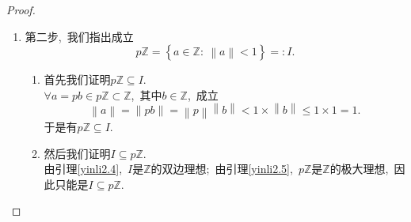 \documentclass[UTF8, twoside]{ctexart}
\makeatletter
\newcommand*\bigcdot{\mathpalette\bigcdot@{.5}}
\newcommand*\bigcdot@[2]{\mathbin{\vcenter{\hbox{\scalebox{#2}{$\m@th#1\bullet$}}}}}
\theoremstyle{nonumberplain}
\newtheorem{proof}{\heiti 证明}  %
\theoremstyle{nonumberplain}
\theoremstyle{plain}
\makeatother
\begin{document}
\begin{proof}
\begin{enumerate}
\begin{enumerate}
\begin{align}
					& =1. 
				\end{align}
				另一方面,\ 由定义\ref{赋值定义}的第(1)条,\ 有
				\begin{equation} \label{Os:1.1.4}
					\left\| 0 \right\|=0.
				\end{equation}
				由命题\ref{赋值性质}的性质(1),\ 有
				\begin{equation} \label{Os:1.1.5}
					\left\| 1 \right\|=1.
				\end{equation}
				由式(\ref{Os:1.1.3}),\ 式(\ref{Os:1.1.4}),\ 式(\ref{Os:1.1.5})和命题\ref{赋值性质}的性质(4),\ 
				$\forall a=b/c\in \mathbb{Q}$,\ 其中$b\in \mathbb{Z}$,\ $c\in {{\mathbb{Z}}_{\ne 0}}$,\ 有
				\begin{equation} \label{Os:1.1.6}
					\left\| a \right\|=\left\| \frac{b}{c} \right\|=\frac{\left\| b \right\|}{\left\| c \right\|}=\left\{ \begin{aligned}
						& 1,\ b\ne 0, \\ 
						& 0,\ b=0. \\ 
					\end{aligned} \right.
				\end{equation}
				式(\ref{Os:1.1.6})意味着$\left\| \bigcdot  \right\|$是平凡赋值,\ 矛盾.\ 
				由反证法,\ 至少存在一个素数$p$满足$\left\| p \right\|\ne 1$. 由式(\ref{Os:1.1.1}),\ 
				成立$\left\| p \right\|<1$.
				\vskip 0.3cm
			
				\item 第二步,\ 我们指出成立
				\begin{equation} \label{Os:1.2.1}
					p\mathbb{Z}=\left\{ a\in \mathbb{Z}:\ \left\| a \right\|<1 \right\}=:I.
				\end{equation}
				\vskip 0.3cm
				\begin{enumerate}
					\item 首先我们证明$p\mathbb{Z}\subseteq I$.\\
					$\forall a=pb\in p\mathbb{Z}\subset \mathbb{Z}$,\ 其中$b\in \mathbb{Z}$,\ 成立
					\[
					\left\| a \right\|=\left\| pb \right\|=\left\| p \right\|\left\| b \right\|<1\times \left\| b \right\|\le 1\times 1=1.
					\]
					于是有$p\mathbb{Z}\subseteq I$.\ 
					\vskip 0.3cm
					
					\item 然后我们证明$I\subseteq p\mathbb{Z}$.\\
					由引理\ref{yinli2.4},\ $I$是$\mathbb{Z}$的双边理想;\ 
					由引理\ref{yinli2.5},\ $p\mathbb{Z}$是$\mathbb{Z}$的极大理想,\ 因此只能是$I\subseteq p\mathbb{Z}$. 
				\end{enumerate}
				\vskip 0.3cm
				

\end{enumerate}
\end{enumerate}
\end{proof}
\end{document}
